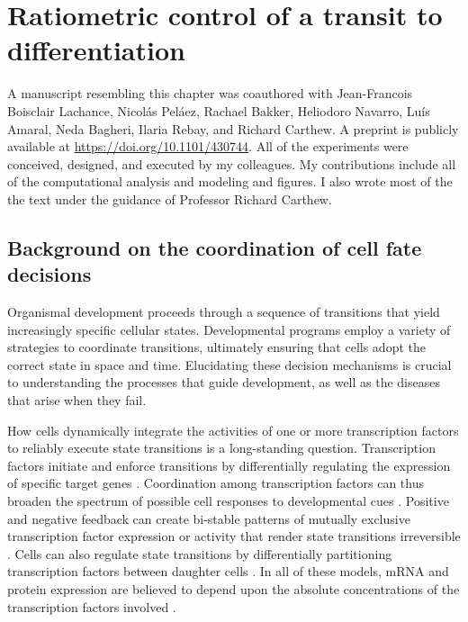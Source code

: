 
\graphicspath{ {figures/ratio/} }


\chapter{Ratiometric control of a transit to differentiation}
\label{ch:ratio}

A manuscript resembling this chapter was coauthored with Jean-Francois Boisclair Lachance, Nicol\'{a}s Pel\'{a}ez, Rachael Bakker, Heliodoro Navarro, Lu\'{i}s Amaral, Neda Bagheri, Ilaria Rebay, and Richard Carthew. A preprint is publicly available at \url{https://doi.org/10.1101/430744}. All of the experiments were conceived, designed, and executed by my colleagues. My contributions include all of the computational analysis and modeling and figures. I also wrote most of the the text under the guidance of Professor Richard Carthew.


\section{Background on the coordination of cell fate decisions}

Organismal development proceeds through a sequence of transitions that yield increasingly specific cellular states. Developmental programs employ a variety of strategies to coordinate transitions, ultimately ensuring that cells adopt the correct state in space and time. Elucidating these decision mechanisms is crucial to understanding the processes that guide development, as well as the diseases that arise when they fail.

How cells dynamically integrate the activities of one or more transcription factors to reliably execute state transitions is a long-standing question. Transcription factors initiate and enforce transitions by differentially regulating the expression of specific target genes \cite{Zheng1997,Ducy1997,McGhee2009}. Coordination among transcription factors can thus broaden the spectrum of possible cell responses to developmental cues \cite{ORiordan1999,Evans2003}. Positive and negative feedback can create bi-stable patterns of mutually exclusive transcription factor expression or activity that render state transitions irreversible \cite{Melen2005,Kueh2013,Yao2008,Park2012}. Cells can also regulate state transitions by differentially partitioning transcription factors between daughter cells \cite{Wolff2018}. In all of these models, mRNA and protein expression are believed to depend upon the absolute concentrations of the transcription factors involved \cite{Tontonoz1994,Laslo2006,Raj2010,Niwa2000}.

